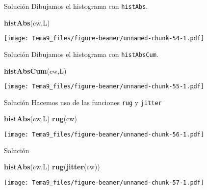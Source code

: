\documentclass[
  ignorenonframetext,
]{beamer}
\newenvironment{Shaded}{\begin{snugshade}}{\end{snugshade}}
\newcommand{\KeywordTok}[1]{\textcolor[rgb]{0.13,0.29,0.53}{\textbf{#1}}}
\newcommand{\NormalTok}[1]{#1}
\begin{document}
\begin{frame}[fragile]{Solución}
\protect\hypertarget{soluciuxf3n-39}{}
Dibujamos el histograma con \texttt{histAbs}.

\begin{Shaded}
\begin{Highlighting}[]
\KeywordTok{histAbs}\NormalTok{(cw,L)}
\end{Highlighting}
\end{Shaded}

\texttt{[image: Tema9\_files/figure-beamer/unnamed-chunk-54-1.pdf]}
\end{frame}

\begin{frame}[fragile]{Solución}
\protect\hypertarget{soluciuxf3n-40}{}
Dibujamos el histograma con \texttt{histAbsCum}.

\begin{Shaded}
\begin{Highlighting}[]
\KeywordTok{histAbsCum}\NormalTok{(cw,L)}
\end{Highlighting}
\end{Shaded}

\texttt{[image: Tema9\_files/figure-beamer/unnamed-chunk-55-1.pdf]}
\end{frame}

\begin{frame}[fragile]{Solución}
\protect\hypertarget{soluciuxf3n-41}{}
Hacemos uso de las funciones \texttt{rug} y \texttt{jitter}

\begin{Shaded}
\begin{Highlighting}[]
\KeywordTok{histAbs}\NormalTok{(cw,L)}
\KeywordTok{rug}\NormalTok{(cw)}
\end{Highlighting}
\end{Shaded}

\texttt{[image: Tema9\_files/figure-beamer/unnamed-chunk-56-1.pdf]}
\end{frame}

\begin{frame}[fragile]{Solución}
\protect\hypertarget{soluciuxf3n-42}{}
\begin{Shaded}
\begin{Highlighting}[]
\KeywordTok{histAbs}\NormalTok{(cw,L)}
\KeywordTok{rug}\NormalTok{(}\KeywordTok{jitter}\NormalTok{(cw))}
\end{Highlighting}
\end{Shaded}

\texttt{[image: Tema9\_files/figure-beamer/unnamed-chunk-57-1.pdf]}
\end{frame}
\end{document}
